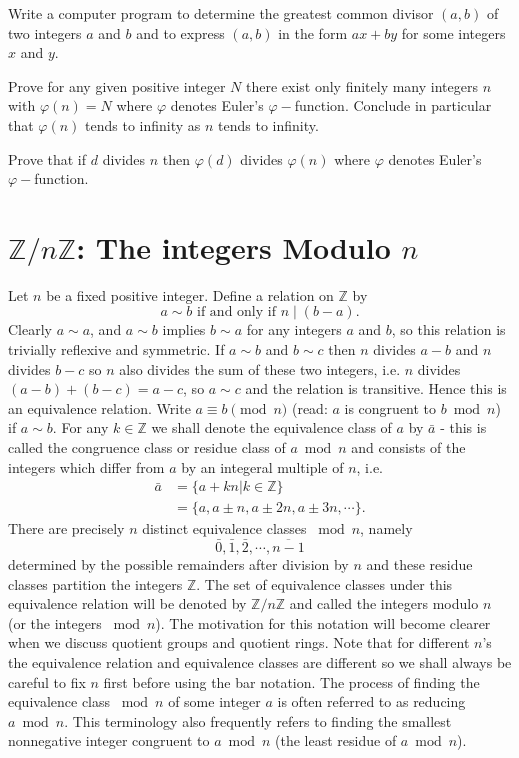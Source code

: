 \documentclass[cn,11pt,chinese]{elegantbook}
\numberwithin{equation}{section}
\begin{document}
\begin{problemset}
\item Write a computer program to determine the greatest common divisor $(a, b)$ of two integers $a$ and $b$ and to express $(a, b)$ in the form $ax + by$ for some integers $x$ and $y$.

\item Prove for any given positive integer $N$ there exist only finitely many integers $n$ with $\varphi(n) = N$ where $\varphi$ denotes Euler's $\varphi-$function. Conclude in particular that $\varphi(n)$ tends to infinity as $n$ tends to infinity.

\item Prove that if $d$ divides $n$ then $\varphi(d)$ divides $\varphi(n)$ where $\varphi$ denotes Euler's $\varphi-$function.

\end{problemset}


\section{$\mathbb{Z}/n\mathbb{Z}$: The integers Modulo $n$}\label{section00003}
Let $n$ be a fixed positive integer. Define a relation on $\mathbb{Z}$ by
\[
a \sim b \text{ if and only if }n \mid (b - a).
\]
Clearly $a \sim a$, and $a \sim b$ implies $b \sim a$ for any integers $a$ and $b$, so this relation is trivially reflexive and symmetric. If $a \sim b$ and $b \sim c$ then $n$ divides $a-b$ and $n$ divides $b-c$ so $n$ also divides the sum of these two integers, i.e. $n$ divides $(a-b) + (b-c) = a-c$, so $a \sim c$ and the relation is transitive. Hence this is an equivalence relation. Write $a \equiv b \pmod{n}$ (read: $a$ is congruent to $b \bmod{n}$) if $a \sim b$. For any $k \in \mathbb{Z}$ we shall denote the equivalence class of $a$ by $\bar{a}$ - this is called the congruence class or residue class of $a \bmod{n}$ and consists of the integers which differ from $a$ by an integeral multiple of $n$, i.e.
\[
\begin{aligned}
\bar{a} &= \{ a + kn | k \in \mathbb{Z}\}\\
&= \{a, a \pm n, a \pm{2n}, a \pm{3n},\cdots\}.
\end{aligned}
\]
There are precisely $n$ distinct equivalence classes $\bmod{n}$, namely
\[
\bar{0}, \bar{1}, \bar{2}, \cdots, \overline{n-1}
\]
determined by the possible remainders after division by $n$ and these residue classes partition the integers $\mathbb{Z}$. The set of equivalence classes under this equivalence relation  will be denoted by $\mathbb{Z}/n\mathbb{Z}$ and called the integers modulo $n$ (or the integers $\bmod{n}$). The motivation for this notation will become clearer when we discuss quotient groups and quotient rings. Note that for different $n$'s the equivalence relation and equivalence classes are different so we shall always be careful to fix $n$ first before using the bar notation. The process of finding the equivalence class $\bmod{n}$ of some integer $a$ is often referred to as reducing $a \bmod{n}$. This terminology also frequently refers to finding the smallest nonnegative integer congruent to $a \bmod{n}$ (the least residue of $a \bmod{n}$).
\end{document}
